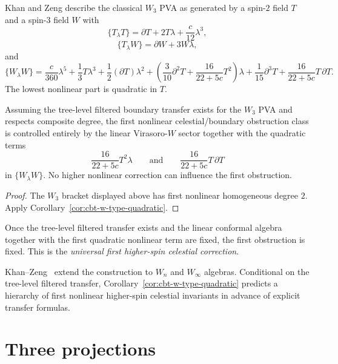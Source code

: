 Khan and Zeng describe the classical $W_3$ PVA as generated by a spin-$2$ field $T$ and a spin-$3$ field $W$ with
\[
\{T_\lambda T\}=\partial T+2T\lambda+\frac{c}{12}\lambda^3,
\]
\[
\{T_\lambda W\}=\partial W+3W\lambda,
\]
and
\[
\{W_\lambda W\}
=
\frac{c}{360}\lambda^5
+\frac13 T\lambda^3
+\frac12(\partial T)\lambda^2
+\left(\frac{3}{10}\partial^2T+\frac{16}{22+5c}T^2\right)\lambda
+\frac1{15}\partial^3T
+\frac{16}{22+5c}T\,\partial T.
\]
The lowest nonlinear part is quadratic in $T$.

\begin{corollary}
\label{cor:cbt-w3-obstruction}
\ClaimStatusConditional
Assuming the tree-level filtered boundary transfer exists for the $W_3$ PVA and respects composite degree, the first nonlinear celestial/boundary obstruction class is controlled entirely by the linear Virasoro-$W$ sector together with the quadratic terms
\[
\frac{16}{22+5c}T^2\lambda
\qquad\text{and}\qquad
\frac{16}{22+5c}T\,\partial T
\]
in $\{W_\lambda W\}$. No higher nonlinear correction can influence the first obstruction.
\end{corollary}

\begin{proof}
The $W_3$ bracket displayed above has first nonlinear homogeneous degree $2$. Apply Corollary~\ref{cor:cbt-w-type-quadratic}.
\end{proof}

\begin{remark}
\label{rem:cbt-universal-first-correction}
Once the tree-level filtered transfer exists and the linear conformal algebra together with the first quadratic nonlinear term are fixed, the first obstruction is fixed. This is the \emph{universal first higher-spin celestial correction}.
\end{remark}

\begin{remark}[beyond $W_3$]
\label{rem:cbt-beyond-w3}
Khan--Zeng~\cite{KZ25} extend the construction to $W_n$ and $W_\infty$ algebras. Conditional on the tree-level filtered transfer, Corollary~\ref{cor:cbt-w-type-quadratic} predicts a hierarchy of first nonlinear higher-spin celestial invariants in advance of explicit transfer formulas.
\end{remark}

\section{Three projections}
\label{sec:cbt-synthesis}

